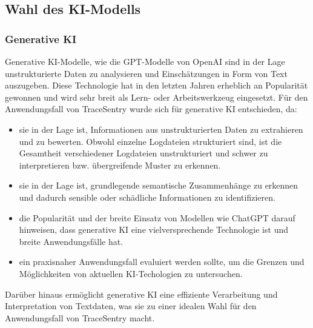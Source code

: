 \documentclass[a4paper,12pt]{report}
\begin{document}
    \subsection{Wahl des KI-Modells}\label{subsec:wahl-des-ki-modells}

    \subsubsection{Generative KI}\label{subsubsec:generative-ki}
    Generative KI-Modelle, wie die GPT-Modelle von OpenAI sind in der Lage unstrukturierte Daten zu analysieren und Einschätzungen in Form von Text auszugeben.
    Diese Technologie hat in den letzten Jahren erheblich an Popularität gewonnen und wird sehr breit als Lern- oder Arbeitswerkzeug eingesetzt.
    Für den Anwendungsfall von TraceSentry wurde sich für generative KI entschieden, da:
    \begin{itemize}
        \item sie in der Lage ist, Informationen aus unstrukturierten Daten zu extrahieren und zu bewerten.
        Obwohl einzelne Logdateien strukturiert sind, ist die Gesamtheit verschiedener Logdateien unstrukturiert und schwer zu interpretieren bzw. übergreifende Muster zu erkennen.
        \item sie in der Lage ist, grundlegende semantische Zusammenhänge zu erkennen und dadurch sensible oder schädliche Informationen zu identifizieren.
        \item die Popularität und der breite Einsatz von Modellen wie ChatGPT darauf hinweisen, dass generative KI eine vielversprechende Technologie ist und breite Anwendungsfälle hat.
        \item ein praxisnaher Anwendungsfall evaluiert werden sollte, um die Grenzen und Möglichkeiten von aktuellen KI-Techologien zu untersuchen.
    \end{itemize}
    Darüber hinaus ermöglicht generative KI eine effiziente Verarbeitung und Interpretation von Textdaten, was sie zu einer idealen Wahl für den Anwendungsfall von TraceSentry macht.
\end{document}
